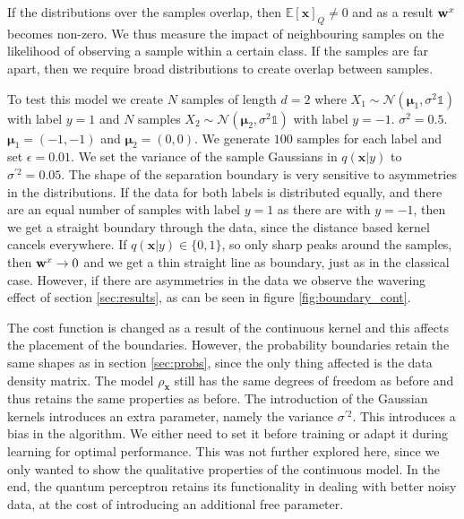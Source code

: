 If the distributions over the samples overlap, then $ \mathbb{E}[\mathbf{x}]_{Q} \neq 0$ and as a result $\mathbf{w}^{x}$ becomes non-zero. We thus measure the impact of neighbouring samples on the likelihood of observing a sample within a certain class. If the samples are far apart, then we require broad distributions to create overlap between samples. \newline 

\noindent To test this model we create $N$ samples of length $d=2$ where $X_1\sim \mathcal{N}(\bm{\mu}_1,\sigma^2 \mathbb{1})$ with label $y=1$ and $N$ samples $X_2\sim \mathcal{N}(\bm{\mu}_2, \sigma^2 \mathbb{1})$ with label $y=-1$. $\sigma^2 = 0.5$. $\bm{\mu}_1 = (-1,-1)$ and $\bm{\mu}_2 = (0,0)$. We generate $100$ samples for each label and set $\epsilon=0.01$. We set the variance of the sample Gaussians in $q(\mathbf{x} | y)$ to $\sigma^{\prime 2} = 0.05$. The shape of the separation boundary is very sensitive to asymmetries in the distributions. If the data for both labels is distributed equally, and there are an equal number of samples with label $y=1$ as there are with $y=-1$, then we get a straight boundary through the data, since the distance based kernel cancels everywhere. If $q(\mathbf{x} | y)\in \{0,1\}$, so only sharp peaks around the samples, then $\mathbf{w}^{x}\rightarrow 0$ and we get a thin straight line as boundary, just as in the classical case. However, if there are asymmetries in the data we observe the wavering effect of section \ref{sec:results}, as can be seen in figure \ref{fig:boundary_cont}.\newline

\noindent The cost function is changed as a result of the continuous kernel and this affects the placement of the boundaries. However, the probability boundaries retain the same shapes as in section \ref{sec:probs}, since the only thing affected is the data density matrix. The model $\rho_\mathbf{x}$ still has the same degrees of freedom as before and thus retains the same properties as before. The introduction of the Gaussian kernels introduces an extra parameter, namely the variance $\sigma^{\prime 2}$. This introduces a bias in the algorithm. We either need to set it before training or adapt it during learning for optimal performance. This was not further explored here, since we only wanted to show the qualitative properties of the continuous model. In the end, the quantum perceptron retains its functionality in dealing with better noisy data, at the cost of introducing an additional free parameter.

